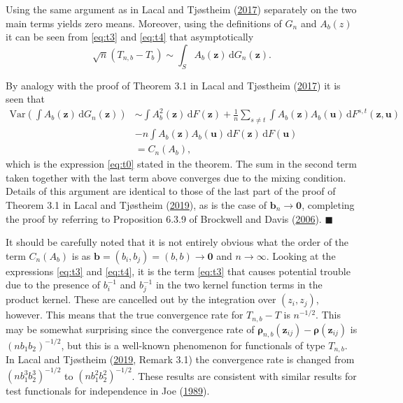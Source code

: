 \documentclass[
  12pt,
  letterpaper]{article}
\numberwithin{equation}{section}
\newcommand{\z}{\bm{z}}
\newcommand{\fu}{\bm{u}}
\newcommand{\frho}{\bm{\rho}}
\newcommand{\bb}{\bm{b}}
\newcommand{\Var}{\textrm{Var}}
\newcommand{\di}{\,\textrm{d}}
\begin{document}
Using the same argument as in Lacal and Tjøstheim (\protect\hyperlink{ref-lacal2017local}{2017}) separately on the two main terms yields zero means. Moreover, using the definitions of \(G_n\) and \(A_b(z)\) it can be seen from \eqref{eq:t3} and \eqref{eq:t4} that asymptotically
\[
\sqrt{n}\left(T_{n,b} - T_b\right) \sim \int_S A_b(\z) \di G_n(\z).
\]

By analogy with the proof of Theorem 3.1 in Lacal and Tjøstheim (\protect\hyperlink{ref-lacal2017local}{2017}) it is seen that
\begin{align*}
\Var\left(\int A_b(\z) \di G_n(\z)\right) &\sim \int A_b^2(\z) \di F(\z) + \frac{1}{n}\sum_{s \neq t} \int A_b(\z)A_b(\fu) \di F^{s,t}(\z,\fu) \\ 
& - n\int A_b(\z)A_b(\fu) \di F(\z)\di F(\fu) \\
& = C_n(A_b),
\end{align*}
which is the expression \eqref{eq:t0} stated in the theorem. The sum in the second term taken together with the last term above converges due to the mixing condition. Details of this argument are identical to those of the last part of the proof of Theorem 3.1 in Lacal and Tjøstheim (\protect\hyperlink{ref-lacal2018estimating}{2019}), as is the case of \(\bb_n \rightarrow \bm{0}\), completing the proof by referring to Proposition 6.3.9 of Brockwell and Davis (\protect\hyperlink{ref-brockwell1991time}{2006}). \(\blacksquare\)

It should be carefully noted that it is not entirely obvious what the order of the term \(C_n(A_b)\) is as \(\bb = (b_i,b_j) = (b,b) \to \bm{0}\) and \(n \to \infty\). Looking at the expressions \eqref{eq:t3} and \eqref{eq:t4}, it is the term \eqref{eq:t3} that causes potential trouble due to the presence of \(b_i^{-1}\) and \(b_j^{-1}\) in the two kernel function terms in the product kernel. These are cancelled out by the integration over \((z_i,z_j)\), however. This means that the true convergence rate for \(T_{n,b}-T\) is \(n^{-1/2}\). This may be somewhat surprising since the convergence rate of \(\frho_{n,b}(\z_{ij})-\frho(\z_{ij})\) is \((nb_1b_2)^{-1/2}\), but this is a well-known phenomenon for functionals of type \(T_{n,b}\). In Lacal and Tjøstheim (\protect\hyperlink{ref-lacal2018estimating}{2019}, Remark 3.1) the convergence rate is changed from \((nb_1^3b_2^3)^{-1/2}\) to \((nb_1^2b_2^2)^{-1/2}\). These results are consistent with similar results for test functionals for independence in Joe (\protect\hyperlink{ref-joe1989estimation}{1989}).
\end{document}
